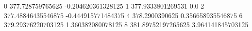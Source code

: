 0 377.728759765625 -0.204620361328125
1 377.9333801269531 0.0
2 377.48846435546875 -0.444915771484375
4 378.2900390625 0.356658935546875
6 379.29376220703125 1.360382080078125
8 381.89752197265625 3.964141845703125
